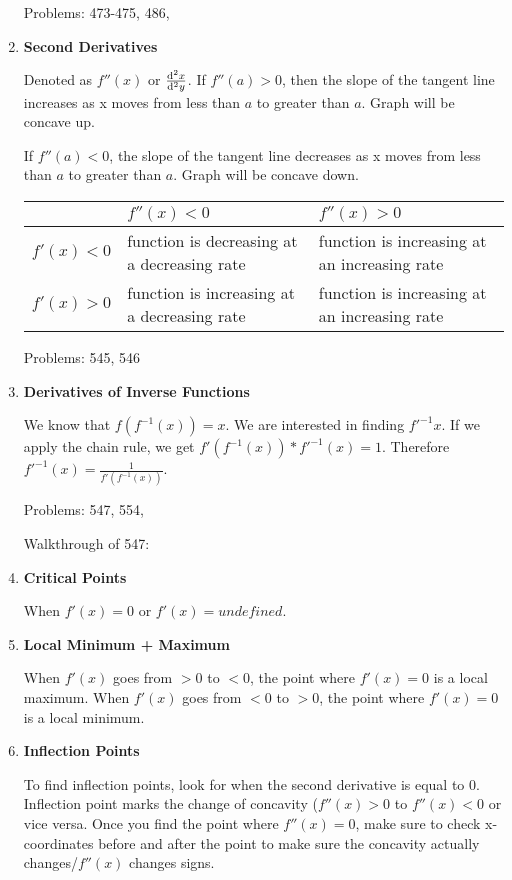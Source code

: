 \documentclass{article}
\begin{document}
\begin{enumerate}
Problems: 473-475, 486, 

\item \textbf{Second Derivatives}

Denoted as $f''(x)$ or $\frac{\odif[order={2}]{x}}{\odif[order={2}]{y}}$. 
If $f''(a) > 0$, then the slope of the tangent line increases as x moves from less than $a$ to greater than $a$. Graph will be concave up.

If $f''(a) < 0$, the slope of the tangent line decreases as x moves from less than $a$ to greater than $a$. Graph will be concave down.

\begin{center}
\begin{tabularx}{0.8\textwidth} {
| >{\raggedright\arraybackslash}X 
| >{\centering\arraybackslash}X 
| >{\raggedleft\arraybackslash}X |}
\hline
& $f''(x) < 0$ & $f''(x) > 0$ \\
\hline
$f'(x) < 0$ & function is decreasing at a decreasing rate & function is increasing at an increasing rate\\ 
\hline
$f'(x) > 0$ & function is increasing at a decreasing rate & function is increasing at an increasing rate \\
\hline
\end{tabularx}
\end{center}

Problems: 545, 546

\item \textbf{Derivatives of Inverse Functions}

We know that $f(f^{-1}(x)) = x$. We are interested in finding $f'^{-1}x$. If we apply the chain rule, we get $f'(f^{-1}(x)) * f'^{-1}(x) = 1$. Therefore
$f'^{-1}(x) = \frac{1}{f'(f^{-1}(x))}$.

Problems: 547, 554, 

Walkthrough of 547:


\item \textbf{Critical Points}

When $f'(x) = 0$ or $f'(x) = undefined$. 

\item \textbf{Local Minimum + Maximum}

When $f'(x)$ goes from $ > 0$ to $ < 0$, the point where $f'(x) = 0$ is a local maximum. When $f'(x)$ goes from $ < 0$ to $ > 0$, the point where $f'(x) = 0$ is a local minimum. 

\item \textbf{Inflection Points}

To find inflection points, look for when the second derivative is equal to 0. Inflection point marks the change of concavity ($f''(x) > 0$ to $f''(x) < 0$ or vice versa. Once you find the point where $f''(x) = 0$, make sure to check x-coordinates before and after the point to make sure the concavity actually changes/$f''(x)$ changes signs. 


\end{enumerate}
\end{document}
